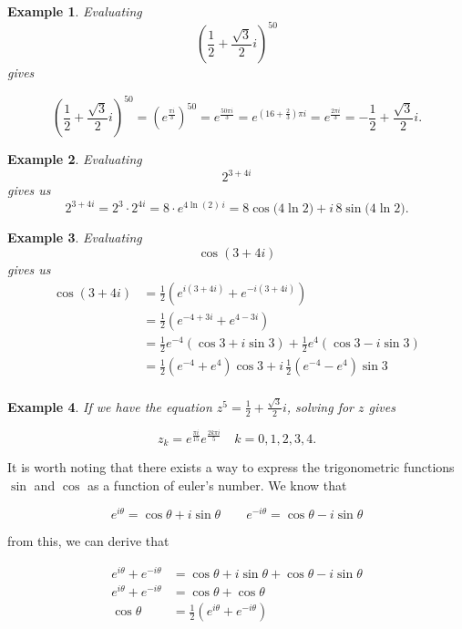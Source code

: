 \documentclass[12pt]{article}
\theoremstyle{plain}
\newtheorem*{example}{Example}
\theoremstyle{definition}
\begin{document}
\begin{example}
    Evaluating $$ \left(\frac{1}{2}+\frac{\sqrt{3}}{2}i\right)^{50} $$ gives

    $$
    \left(\frac{1}{2}+\frac{\sqrt{3}}{2}i\right)^{50}
    =\left(e^{\frac{\pi i}{3}}\right)^{50}
    =e^{\frac{50\pi i}{3}}
    =e^{\left(16+\frac{2}{3}\right)\pi i}
    =e^{\frac{2\pi i}{3}}
    =-\frac{1}{2}+\frac{\sqrt{3}}{2}i.
    $$
\end{example}


\begin{example}
    Evaluating $$2^{3+4i}$$ gives us
    $$
    2^{3+4i}=2^3\cdot 2^{4i}=8\cdot e^{4\ln(2)\,i}
    =8\cos\!\big(4\ln 2\big)+i\,8\sin\!\big(4\ln 2\big).
    $$

\end{example}

\begin{example}
    Evaluating $$\cos(3+4i)$$
    gives us
    \begin{align*}
        \cos(3+4i) &= \frac{1}{2}\!\left(e^{i(3+4i)}+e^{-i(3+4i)}\right) \\
        &= \frac{1}{2}\!\left(e^{-4+3i}+e^{4-3i}\right) \\
        &= \frac{1}{2}e^{-4}(\cos 3+i\sin 3)+\frac{1}{2}e^{4}(\cos 3-i\sin 3) \\
        &= \frac{1}{2}(e^{-4}+e^{4})\cos 3+i\,\frac{1}{2}(e^{-4}-e^{4})\sin 3 \\     
    \end{align*}

\end{example}

\begin{example}
    If we have the equation $z^5=\frac{1}{2}+\frac{\sqrt{3}}{2}i$, solving for $z$ gives

    $$
    z_k = e^{\frac{\pi i}{15}} e^{\frac{2k\pi i}{5}}
    \quad k=0,1,2,3,4.
    $$
\end{example}

It is worth noting that there exists a way to express the trigonometric functions $\sin$ and $\cos$ as a function of euler's number. We know that 

$$
e^{i\theta} = \cos \theta + i \sin \theta \qquad e^{-i\theta} = \cos \theta - i \sin \theta
$$

from this, we can derive that 

\begin{align*}
    e^{i\theta} + e^{-i\theta} &= \cos \theta + i \sin \theta + \cos \theta - i \sin \theta \\
    e^{i\theta} + e^{-i\theta} &= \cos \theta + \cos \theta\\
    \cos \theta &= \frac{1}{2}\left(e^{i\theta} + e^{-i\theta}\right)\\
\end{align*}
\end{document}
